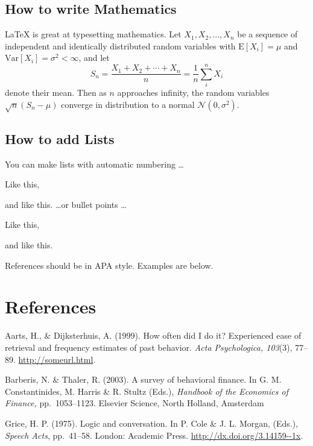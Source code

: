 \documentclass[12pt]{article}
\let\tempone\itemize
\let\temptwo\enditemize
\let\tempthree\enumerate
\let\tempfour\endenumerate
\renewenvironment{itemize}{\tempone\setlength{\itemsep}{0pt}}{\temptwo}
\renewenvironment{enumerate}{\tempthree\setlength{\itemsep}{0pt}}{\tempfour}
\begin{document}
\subsection{How to write Mathematics}

\LaTeX{} is great at typesetting mathematics. Let $X_1, X_2, \ldots,
X_n$ be a sequence of independent and identically distributed random
variables with $\text{E}[X_i] = \mu$ and $\text{Var}[X_i] = \sigma^2 <
\infty$, and let
\[S_n = \frac{X_1 + X_2 + \cdots + X_n}{n}
      = \frac{1}{n}\sum_{i}^{n} X_i\]
denote their mean. Then as $n$ approaches infinity, the random
variables $\sqrt{n}(S_n - \mu)$ converge in distribution to a normal
$\mathcal{N}(0, \sigma^2)$.

\subsection{How to add Lists}

You can make lists with automatic numbering \dots

\begin{enumerate}
\item Like this,
\item and like this.
\end{enumerate}
\dots or bullet points \dots
\begin{itemize}
\item Like this,
\item and like this.
\end{itemize}

References should be in APA style. Examples are below.

%
%
\section*{References}

\begin{hangparas}{1em}{1}

  Aarts, H., \& Dijksterhuis, A. (1999).  How often did I do it?
  Experienced ease of retrieval and frequency estimates of past
  behavior.  \textit{Acta Psychologica, 103}(3), 77--89. \url{http://someurl.html}.

  Barberis, N. \& Thaler, R. (2003). A survey of behavioral finance.
  In G. M. Constantinides, M. Harris \& R. Stultz (Eds.),
  \textit{Handbook of the Economics of Finance,} pp.\ 1053--1123.
  Elsevier Science, North Holland, Amsterdam

\vfill %
\break

Grice, H. P. (1975).  Logic and conversation. In P. Cole \& J.
L. Morgan, (Eds.), \textit{Speech Acts}, pp.\ 41--58. London: Academic
Press. \url{http://dx.doi.org/3.14159--1x}.
\end{hangparas}
\end{document}
